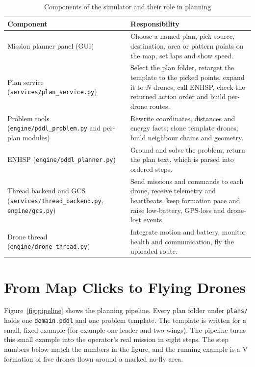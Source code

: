 \documentclass[11pt,a4paper,oneside]{report}
\newcommand{\code}[1]{\texttt{#1}}
\begin{document}
\begin{table}[H]
\caption{Components of the simulator and their role in planning}\label{tab:components}
\small
\begin{tabularx}{\textwidth}{@{}P{0.31\textwidth}Y@{}}
\toprule
\textbf{Component} & \textbf{Responsibility} \\
\midrule
Mission planner panel (GUI) & Choose a named plan, pick source, destination, area or pattern
points on the map, set laps and show speed. \\
Plan service (\code{services/plan\_service.py}) & Select the plan folder, retarget the template
to the picked points, expand it to $N$ drones, call ENHSP, check the returned action order and
build per-drone routes. \\
Problem tools (\code{engine/pddl\_problem.py} and per-plan modules) & Rewrite coordinates,
distances and energy facts; clone template drones; build neighbour chains and geometry. \\
ENHSP (\code{engine/pddl\_planner.py}) & Ground and solve the problem; return the plan text,
which is parsed into ordered steps. \\
Thread backend and GCS (\code{services/thread\_backend.py}, \code{engine/gcs.py}) & Send
missions and commands to each drone, receive telemetry and heartbeats, keep formation pace and
raise low-battery, GPS-loss and drone-lost events. \\
Drone thread (\code{engine/drone\_thread.py}) & Integrate motion and battery, monitor health
and communication, fly the uploaded route. \\
\bottomrule
\end{tabularx}
\end{table}

\section{From Map Clicks to Flying Drones}
Figure~\ref{fig:pipeline} shows the planning pipeline. Every plan folder under \code{plans/}
holds one \code{domain.pddl} and one problem template. The template is written for a small,
fixed example (for example one leader and two wings). The pipeline turns this small example
into the operator's real mission in eight steps. The step numbers below match the numbers in
the figure, and the running example is a V formation of five drones flown around a marked
no-fly area.
\end{document}
